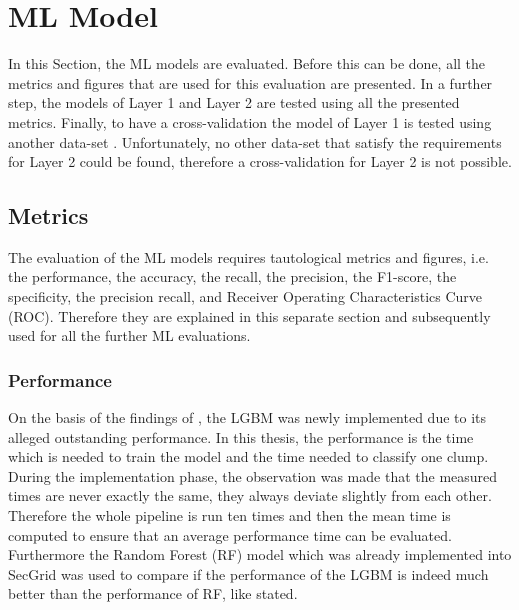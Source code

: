 \section{ML Model}
In this Section, the ML models are evaluated. Before this can be done, all the metrics and figures that are used for this evaluation are presented. In a further step, the models of Layer 1 and Layer 2 are tested using all the presented metrics. Finally, to have a cross-validation the model of Layer 1 is tested using another data-set \cite{ieee_dataset}. Unfortunately, no other data-set that satisfy the requirements for Layer 2 could be found, therefore a cross-validation for Layer 2 is not possible.

\subsection{Metrics}
The evaluation of the ML models requires tautological metrics and figures, i.e. the performance, the accuracy, the recall, the precision, the F1-score, the specificity, the precision recall, and Receiver Operating Characteristics Curve (ROC). Therefore they are explained in this separate section and subsequently used for all the further ML evaluations.

\subsubsection{Performance}
On the basis of the findings of \cite{BehnkeEtAl_FeatureEngineeringMLModelMaliciusDoHTraffic}, the LGBM was newly implemented due to its alleged outstanding performance. In this thesis, the performance is the time which is needed to train the model and the time needed to classify one clump. During the implementation phase, the observation was made that the measured times are never exactly the same, they always deviate slightly from each other. Therefore the whole pipeline is run ten times and then the mean time is computed to ensure that an average performance time can be evaluated. Furthermore the Random Forest (RF) model which was already implemented into SecGrid was used to compare if the performance of the LGBM is indeed much better than the performance of RF, like \cite{BehnkeEtAl_FeatureEngineeringMLModelMaliciusDoHTraffic} stated.


